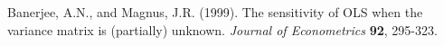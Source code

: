 \begin{thebibliography}{00}

 Banerjee, A.N., and Magnus, J.R. (1999).
 The sensitivity of OLS when the variance matrix is (partially) unknown.
 \emph{Journal of Econometrics} \textbf{92}, 295-323.\\[-1.7em]


\end{thebibliography}
